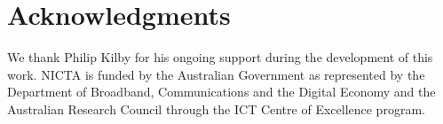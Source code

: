 \section{Acknowledgments}
We thank Philip Kilby for his ongoing support during the development of this work.
NICTA is funded by the Australian Government as represented by the Department of 
Broadband, Communications and the Digital Economy and the Australian Research 
Council through the ICT Centre of Excellence program.

